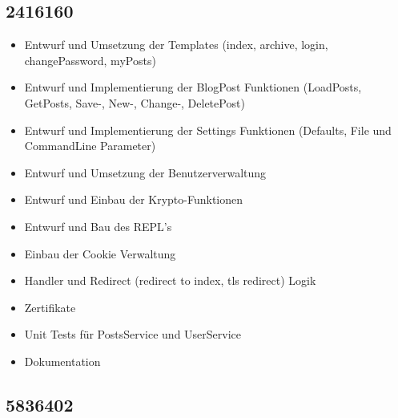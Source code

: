 \documentclass[10pt]{article}
\begin{document}
		\subsection{2416160}
		\begin{itemize}
			\item Entwurf und Umsetzung der Templates (index, archive, login, changePassword, myPosts)
			\item Entwurf und Implementierung der BlogPost Funktionen (LoadPosts, GetPosts, Save-, New-, Change-, DeletePost)
			\item Entwurf und Implementierung der Settings Funktionen (Defaults, File und CommandLine Parameter)
			\item Entwurf und Umsetzung der Benutzerverwaltung
			\item Entwurf und Einbau der Krypto-Funktionen
			\item Entwurf und Bau des REPL's
			\item Einbau der Cookie Verwaltung
			\item Handler und Redirect (redirect to index, tls redirect) Logik
			\item Zertifikate
			\item Unit Tests f\"ur PostsService und UserService
			\item Dokumentation
		\end{itemize}		
		\subsection{5836402}
\end{document}
